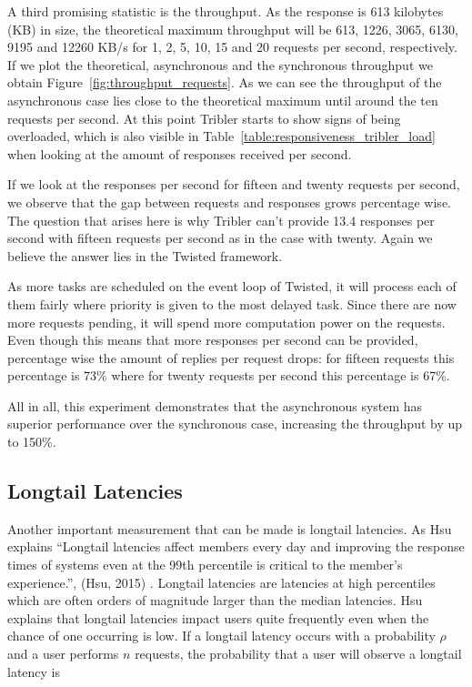 A third promising statistic is the throughput.
As the response is 613 kilobytes (KB) in size, the theoretical maximum throughput will be 613, 1226, 3065, 6130, 9195 and 12260 KB/s for 1, 2, 5, 10, 15 and 20 requests per second, respectively.
If we plot the theoretical, asynchronous and the synchronous throughput we obtain Figure~\ref{fig:throughput_requests}.
As we can see the throughput of the asynchronous case lies close to the theoretical maximum until around the ten requests per second.
At this point Tribler starts to show signs of being overloaded, which is also visible in Table~\ref{table:responsiveness_tribler_load} when looking at the amount of responses received per second.

If we look at the responses per second for fifteen and twenty requests per second, we observe that the gap between requests and responses grows percentage wise.
The question that arises here is why Tribler can't provide 13.4 responses per second with fifteen requests per second as in the case with twenty.
Again we believe the answer lies in the Twisted framework.

As more tasks are scheduled on the event loop of Twisted, it will process each of them fairly where priority is given to the most delayed task.
Since there are now more requests pending, it will spend more computation power on the requests.
Even though this means that more responses per second can be provided, percentage wise the amount of replies per request drops: for fifteen requests this percentage is 73\% where for twenty requests per second this percentage is 67\%.

All in all, this experiment demonstrates that the asynchronous system has superior performance over the synchronous case, increasing the throughput by up to 150\%.

\subsection{Longtail Latencies}
\label{longtail_latencies}

Another important measurement that can be made is longtail latencies.
As Hsu explains \enquote{Longtail latencies affect members every day and improving the response times of systems even at the 99th percentile is critical to the member's experience.}, (Hsu, 2015) \cite{hsu2015who}.
Longtail latencies are latencies at high percentiles which are often orders of magnitude larger than the median latencies.
Hsu explains that longtail latencies impact users quite frequently even when the chance of one occurring is low.
If a longtail latency occurs with a probability $\rho$ and a user performs $n$ requests, the probability that a user will observe a longtail latency is 

